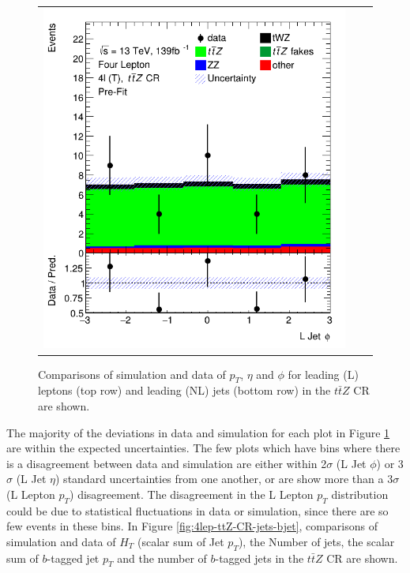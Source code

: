 \begin{figure}[htbp]
\begin{tabular}{ccc}
    \includegraphics[width=.25\textwidth]{figures/PreFitPlots/lep4_ttZ_4T_LJet_phi.png} \\

  \end{tabular}
    \caption{Comparisons of simulation and data of $p_{T}$, $\eta$ and $\phi$ for leading (L) leptons (top row) and leading (NL) jets (bottom row) in the $t\bar{t}Z$ CR are shown.}\label{fig:4lep-ttZ-CR-leptonPlots}
\end{figure}The majority of the deviations in data and simulation for each plot in Figure \ref{fig:4lep-ttZ-CR-leptonPlots} are within the expected uncertainties. The few plots which have bins where there is a disagreement between data and simulation are either within 2$\sigma$ (L Jet $\phi$) or 3$\sigma$ (L Jet $\eta$) standard uncertainties from one another, or are show more than a 3$\sigma$ (L Lepton $p_{T}$) disagreement. The disagreement in the L Lepton $p_{T}$ distribution could be due to statistical fluctuations in data or simulation, since there are so few events in these bins. In Figure \ref{fig:4lep-ttZ-CR-jets-bjet}, comparisons of simulation and data of $H_{T}$ (scalar sum of Jet $p_{T}$), the Number of jets, the scalar sum of $b$-tagged jet $p_{T}$ and the number of $b$-tagged jets in the $t\bar{t}Z$ CR are shown.
